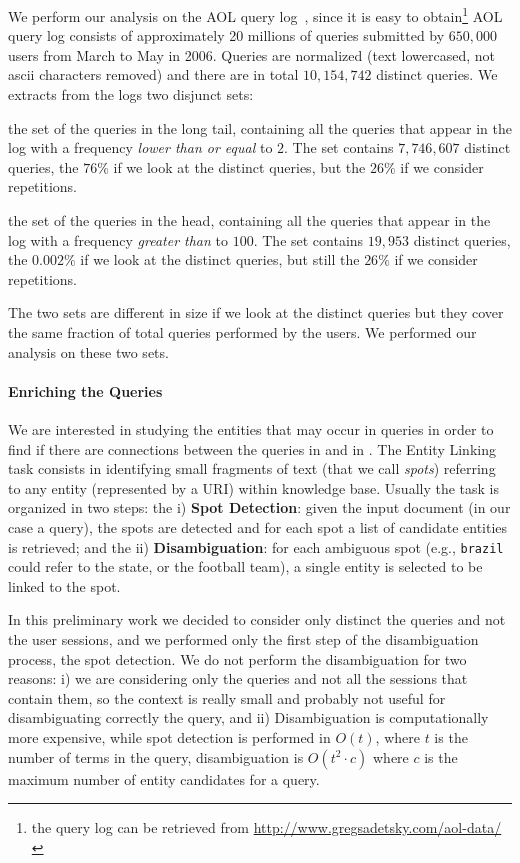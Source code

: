 We perform our analysis on the AOL query log~\cite{pass2006picture}, since it is easy to obtain\footnote{the query log can be retrieved from \url{http://www.gregsadetsky.com/aol-data/}}
AOL query log consists of approximately 20 millions of queries submitted by $650,000$ users from March to May in 2006. Queries are normalized (text lowercased, not ascii characters removed) and 
there are in total $10,154,742$ distinct queries. We extracts from the logs two disjunct sets: 
\begin{description}
	\item{\tail{}} the set of the queries in the long tail, containing all the queries that appear in the log with a frequency \emph{lower than or equal} to $2$. The set contains 
	$7,746,607$ distinct queries, the $76\%$ if we look at the distinct queries, but the $26\%$ if we consider repetitions. 
	\item{\head{}} the set of the queries in the head, containing all the queries that appear in the log with a frequency \emph{greater than} to $100$. The set contains 
	$19,953$ distinct queries, the $0.002\%$ if we look at the distinct queries, but still the $26\%$ if we consider repetitions.
\end{description}
The two sets are different in size if we look at the distinct queries but they cover the same fraction of total queries performed by the users. We performed our 
analysis on these two sets.

\paragraph{Enriching the Queries}
We are interested in studying the entities that may occur in queries in order to find if there are connections between the queries in \head{} and in \tail{}.
The Entity Linking task consists in identifying  small fragments of text (that we call \emph{spots}) referring to any entity (represented by a URI) 
within knowledge base. Usually the task is organized in two steps: the i) \textbf{Spot Detection}: given the input document (in our case a query), 
the spots are detected and for each spot a list of candidate entities is retrieved; and the ii) \textbf{Disambiguation}:
for each ambiguous spot (e.g., \texttt{brazil} could refer to the state, or the football team), a single  entity is 
selected  to be linked to the spot.

In this preliminary work we decided to consider only distinct the queries and not the user sessions, and we performed only the first step of the disambiguation 
process, the spot detection. We do not perform the disambiguation for two reasons: i) we are considering only the queries and not all the sessions that contain 
them, so the context is really small and probably not useful for disambiguating correctly the query, and ii) Disambiguation is computationally more expensive, 
while spot detection is performed in $O(t)$, where $t$ is the number of terms in the query, disambiguation is $O(t^2 \cdot c)$ where $c$ is the maximum 
number of entity candidates for a query.   


